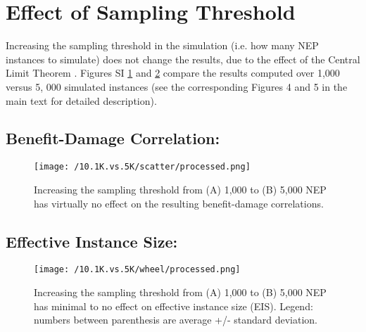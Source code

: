 

\newpage
\section{Effect of Sampling Threshold}\label{sup_1Kvs5K}
Increasing the sampling threshold in the simulation (i.e. how many NEP instances to simulate) does not change the results, due to the effect of the Central Limit Theorem  \cite{kallenberg_foundations_2006}. Figures SI \ref{supp_1Kvs5K_corr} and \ref{supp_1Kvs5K_wheel} %
compare the results computed over 1,000 versus 5, 000 simulated instances (see the corresponding Figures 4 and 5 in the main text for detailed description).
\subsection{Benefit-Damage Correlation:}

\begin{figure}[H]
		\centering
				\texttt{[image: /10.1K.vs.5K/scatter/processed.png]}
				\caption{Increasing the sampling threshold from (A) 1,000 to (B) 5,000 NEP has virtually no effect on the resulting benefit-damage correlations.}
				\label{supp_1Kvs5K_corr}
\end{figure}

\subsection{Effective Instance Size:}

\begin{figure}[H]
		\centering
				\texttt{[image: /10.1K.vs.5K/wheel/processed.png]}
				\caption{Increasing the sampling threshold from (A) 1,000 to (B) 5,000 NEP has minimal to no effect on effective instance size (EIS). Legend: numbers between parenthesis are average +/- standard deviation. }
				\label{supp_1Kvs5K_wheel}
\end{figure}

\begin{comment}
    \subsection{Gained Benefits:}
    \begin{figure}[H]
    		\centering
    				\texttt{[image: /10.1K.vs.5K/ETX/processed.png]}
    				\caption{Increasing the sampling threshold from (A) 1,000 to (B) 5,000 NEP has minimal to no effect on Gained Benefits (GB).}
    				\label{supp_1Kvs5K_EGB}
    \end{figure}
\end{comment}
\printbibliography

